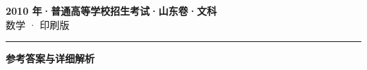 \documentclass[zihao=5, a4paper]{ctexart}
\begin{document}
\begin{center}
  {\Large\bfseries 2010 年·普通高等学校招生考试·山东卷·文科}\\[4pt]
  {\large 数学 · 印刷版}
\end{center}
\medskip
{}

\par\bigskip\hrule\bigskip
{}
\begin{center}{\large\bfseries 参考答案与详细解析}\end{center}
\smallskip

\end{document}
